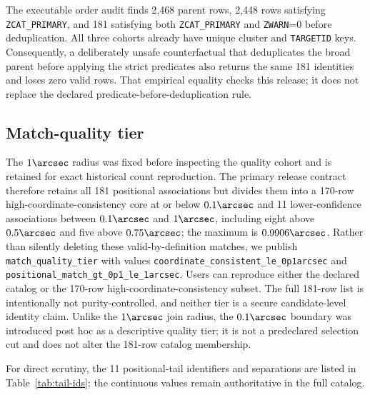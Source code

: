 \documentclass[twocolumn,linenumbers]{aastex702}
\begin{document}
The executable order audit finds 2,468 parent rows, 2,448 rows satisfying
\texttt{ZCAT\_PRIMARY}, and 181 satisfying both \texttt{ZCAT\_PRIMARY} and
\texttt{ZWARN}=0 before deduplication.  All three cohorts already have unique cluster and
\texttt{TARGETID} keys.  Consequently, a deliberately unsafe counterfactual that deduplicates the
broad parent before applying the strict predicates also returns the same 181 identities and loses
zero valid rows.  That empirical equality checks this release; it does not replace the declared
predicate-before-deduplication rule.

\subsection{Match-quality tier}\label{sec:match-tier}

The $1\arcsec$ radius was fixed before inspecting the quality cohort and is retained for exact
historical count reproduction.  The primary release contract therefore retains all 181 positional
associations but divides them into a 170-row high-coordinate-consistency core at or below
$0.1\arcsec$ and 11 lower-confidence associations between $0.1\arcsec$ and $1\arcsec$, including
eight above $0.5\arcsec$ and five above $0.75\arcsec$; the maximum is $0.9906\arcsec$.  Rather than
silently deleting these valid-by-definition matches, we publish \texttt{match\_quality\_tier} with
values \texttt{coordinate\_consistent\_le\_0p1arcsec} and
\texttt{positional\_match\_gt\_0p1\_le\_1arcsec}.  Users can reproduce either the declared catalog
or the 170-row high-coordinate-consistency subset.  The full 181-row list is intentionally not
purity-controlled, and neither tier is a secure candidate-level identity claim.
Unlike the $1\arcsec$ join radius, the $0.1\arcsec$ boundary was introduced post hoc as a
descriptive quality tier; it is not a predeclared selection cut and does not alter the 181-row
catalog membership.

For direct scrutiny, the 11 positional-tail identifiers and separations are listed in
Table~\ref{tab:tail-ids}; the continuous values remain authoritative in the full catalog.
\end{document}

